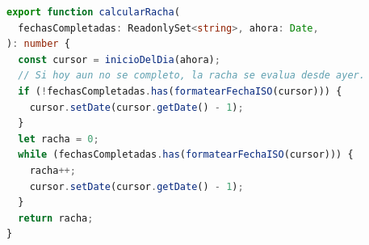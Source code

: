 \begin{lstlisting}[language=TypeScript, caption={Cálculo de la racha de entrenamientos}, label={lst:racha}]
export function calcularRacha(
  fechasCompletadas: ReadonlySet<string>, ahora: Date,
): number {
  const cursor = inicioDelDia(ahora);
  // Si hoy aun no se completo, la racha se evalua desde ayer.
  if (!fechasCompletadas.has(formatearFechaISO(cursor))) {
    cursor.setDate(cursor.getDate() - 1);
  }
  let racha = 0;
  while (fechasCompletadas.has(formatearFechaISO(cursor))) {
    racha++;
    cursor.setDate(cursor.getDate() - 1);
  }
  return racha;
}
\end{lstlisting}

